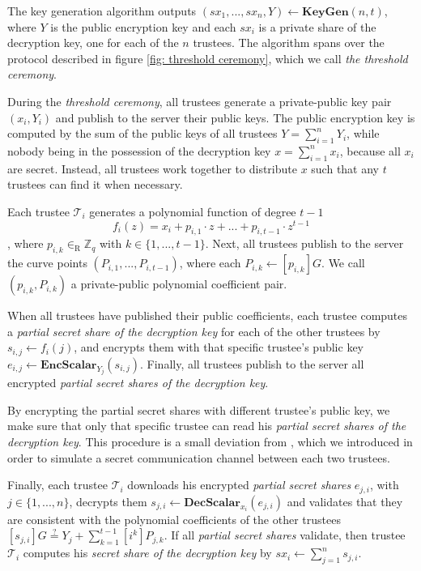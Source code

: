 The key generation algorithm outputs \( (sx_1, ..., sx_n, Y) \leftarrow \mathbf{KeyGen} (n, t) \), where $Y$ is the public encryption key and each $sx_i$ is a private share of the decryption key, one for each of the $n$ trustees. The algorithm spans over the protocol described in figure \ref{fig: threshold ceremony}, which we call \textit{the threshold ceremony}.

During the \textit{threshold ceremony}, all trustees generate a private-public key pair $(x_i, Y_i)$ and publish to the server their public keys. The public encryption key is computed by the sum of the public keys of all trustees \( Y = \sum_{i=1}^n Y_i \), while nobody being in the possession of the decryption key \( x = \sum_{i=1}^n x_i \), because all $x_i$ are secret. Instead, all trustees work together to distribute $x$ such that any $t$ trustees can find it when necessary.

Each trustee $\mathcal{T}_i$ generates a polynomial function of degree $t-1$
\[
f_i(z) = x_i + p_{i,1} \cdot z + ... + p_{i,t-1} \cdot z^{t-1}
\]
, where \( p_{i,k} \in_\mathrm{R} \mathbb{Z}_q \) with \( k \in \{ 1, ..., t-1 \} \). Next, all trustees publish to the server the curve points \( (P_{i,1}, ..., P_{i,t-1}) \), where each \( P_{i,k} \gets [p_{i,k}]G \). We call $(p_{i,k}, P_{i,k})$ a private-public polynomial coefficient pair.

When all trustees have published their public coefficients, each trustee computes a \textit{partial secret share of the decryption key} for each of the other trustees by \( s_{i,j} \gets f_i(j) \), and encrypts them with that specific trustee's public key \( e_{i,j} \gets \mathbf{EncScalar}_{Y_j} (s_{i,j}) \). Finally, all trustees publish to the server all encrypted \textit{partial secret shares of the decryption key}.

By encrypting the partial secret shares with different trustee's public key, we make sure that only that specific trustee can read his \textit{partial secret shares of the decryption key}. This procedure is a small deviation from \cite{Pedersen91}, which we introduced in order to simulate a secret communication channel between each two trustees.

Finally, each trustee $\mathcal{T}_i$ downloads his encrypted \textit{partial secret shares} $e_{j,i}$, with \( j \in \{ 1, ..., n \} \), decrypts them \( s_{j,i} \gets \mathbf{DecScalar}_{x_i} (e_{j,i}) \) and validates that they are consistent with the polynomial coefficients of the other trustees \( [s_{j,i}]G \stackrel{?}{=} Y_j + \sum_{k=1}^{t-1} [i^k] P_{j,k} \). If all \textit{partial secret shares} validate, then trustee $\mathcal{T}_i$ computes his \textit{secret share of the decryption key} by \( sx_i \gets \sum_{j=1}^n s_{j,i} \).


